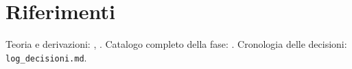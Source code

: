 \documentclass[11pt,a4paper]{article}
\begin{document}
\section*{Riferimenti}

Teoria e derivazioni: \texttt{},
\texttt{}. Catalogo
completo della fase: \texttt{}.
Cronologia delle decisioni: \texttt{log\_decisioni.md}.
\end{document}
